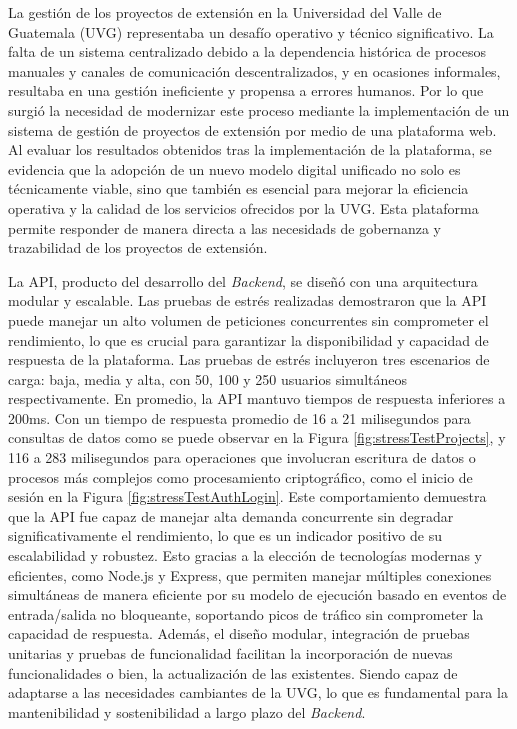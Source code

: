 La gestión de los proyectos de extensión en la Universidad del Valle de Guatemala (UVG) representaba un desafío
operativo y técnico significativo. La falta de un sistema centralizado debido a la dependencia histórica de
procesos manuales y canales de comunicación descentralizados, y en ocasiones informales, resultaba en una gestión
ineficiente y propensa a errores humanos.
Por lo que surgió la necesidad de modernizar este proceso mediante la implementación de un sistema de gestión de
proyectos de extensión por medio de una plataforma web. Al evaluar los resultados obtenidos tras la implementación
de la plataforma, se evidencia que la adopción de un nuevo modelo digital unificado no solo es técnicamente viable,
sino que también es esencial para mejorar la eficiencia operativa y la calidad de los servicios ofrecidos por la
UVG. Esta plataforma permite responder de manera directa a las necesidads de gobernanza y trazabilidad de los
proyectos de extensión.

La API, producto del desarrollo del \textit{Backend}, se diseñó con una arquitectura modular y escalable. Las pruebas
de estrés realizadas demostraron que la API puede manejar un alto volumen de peticiones concurrentes sin comprometer
el rendimiento, lo que es crucial para garantizar la disponibilidad y capacidad de respuesta de la plataforma. Las
pruebas de estrés incluyeron tres escenarios de carga: baja, media y alta, con 50, 100 y 250 usuarios simultáneos
respectivamente.
En promedio, la API mantuvo tiempos de respuesta inferiores a 200ms. Con un tiempo de respuesta promedio de 16 a 21
milisegundos para consultas de datos como se puede observar en la Figura \ref{fig:stressTestProjects}, y 116 a 283
milisegundos para operaciones que involucran escritura de datos o procesos más complejos como procesamiento criptográfico,
como el inicio de sesión en la Figura \ref{fig:stressTestAuthLogin}.
Este comportamiento demuestra que la API fue capaz de manejar alta demanda concurrente sin degradar significativamente
el rendimiento, lo que es un indicador positivo de su escalabilidad y robustez. Esto gracias a la elección de tecnologías
modernas y eficientes, como Node.js y Express, que permiten manejar múltiples conexiones simultáneas de manera eficiente
por su modelo de ejecución basado en eventos de entrada/salida no bloqueante, soportando picos de tráfico sin comprometer
la capacidad de respuesta.
Además, el diseño modular, integración de pruebas unitarias y pruebas de funcionalidad facilitan la incorporación
de nuevas funcionalidades o bien, la actualización de las existentes. Siendo capaz de adaptarse a las necesidades
cambiantes de la UVG, lo que es fundamental para la mantenibilidad y sostenibilidad a largo plazo del \textit{Backend}.

